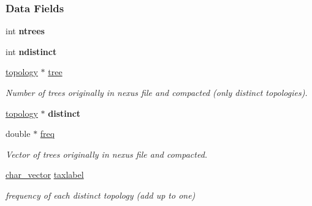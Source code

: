 \subsubsection*{Data Fields}
\begin{DoxyCompactItemize}
\item 
\mbox{\label{structtopology__space__struct_ab0a9425ca296b9cd5f471e1c6e628820}} 
int {\bfseries ntrees}
\item 
\mbox{\label{structtopology__space__struct_a9b52b128de956bc31a338ec74c5bf92d}} 
int {\bfseries ndistinct}
\item 
\mbox{\label{structtopology__space__struct_a812703670e22b57734a453e09f5d9fe3}} 
\hyperlink{structtopology__struct}{topology} $\ast$ \hyperlink{structtopology__space__struct_a812703670e22b57734a453e09f5d9fe3}{tree}
\begin{DoxyCompactList}\small\item\em Number of trees originally in nexus file and compacted (only distinct topologies). \end{DoxyCompactList}\item 
\mbox{\label{structtopology__space__struct_a04a02a86583f3ca577ec52b133a1f4b3}} 
\hyperlink{structtopology__struct}{topology} $\ast$ {\bfseries distinct}
\item 
\mbox{\label{structtopology__space__struct_a1b1c1f92bce9530c3f1ea363a5f03135}} 
double $\ast$ \hyperlink{structtopology__space__struct_a1b1c1f92bce9530c3f1ea363a5f03135}{freq}
\begin{DoxyCompactList}\small\item\em Vector of trees originally in nexus file and compacted. \end{DoxyCompactList}\item 
\mbox{\label{structtopology__space__struct_ac1b12d8b3461a8e28cdbc40b5ae8ebaa}} 
\hyperlink{structchar__vector__struct}{char\+\_\+vector} \hyperlink{structtopology__space__struct_ac1b12d8b3461a8e28cdbc40b5ae8ebaa}{taxlabel}
\begin{DoxyCompactList}\small\item\em frequency of each distinct topology (add up to one) \end{DoxyCompactList}\item 

\end{DoxyCompactItemize}
